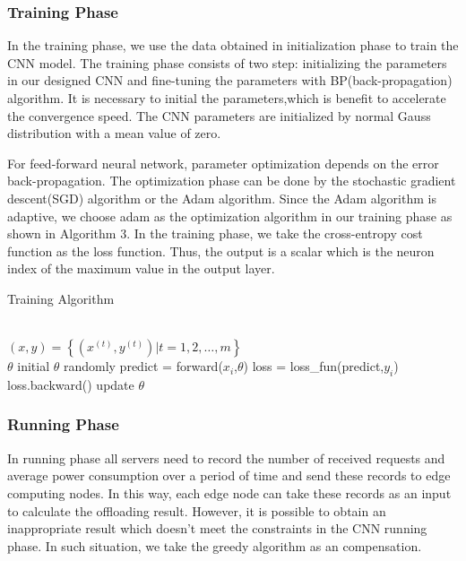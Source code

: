 \documentclass[journal]{IEEEtran}
\begin{document}
\subsubsection{Training Phase}
In the training phase, we use the data obtained in initialization phase to train the CNN model. The training phase consists of two step: initializing the parameters in our designed CNN and fine-tuning the parameters with BP(back-propagation) algorithm. It is necessary to initial the parameters,which is benefit to accelerate the convergence speed. The CNN parameters are initialized by normal Gauss distribution with a mean value of zero. 

For feed-forward neural network, parameter optimization depends on the error back-propagation. The optimization phase can be done by the stochastic gradient descent(SGD) algorithm or the Adam algorithm. Since the Adam algorithm is adaptive, we choose adam as the optimization algorithm in our training phase as shown in Algorithm 3. In the training phase, we take the cross-entropy cost function as the loss function. Thus, the output is a scalar which is the neuron index of the maximum value in the output layer.
\begin{algorithm}[!h]   
\caption{Training Algorithm}   
\label{alg:Framwork}   
\begin{algorithmic}[1]
\REQUIRE ~~\\
$(x,y)= \left\{(x^{(t)},y^{(t)})|t=1,2,\dots,m \right\}$
\ENSURE  ~~\\
$\theta$
\STATE initial $\theta$ randomly
\STATE predict = forward($x_i$,$\theta$)
\STATE loss = loss\_fun(predict,$y_i$)
\STATE loss.backward()
\STATE update $\theta$
\ENDFOR
\end{algorithmic}  
\end{algorithm} 

\subsubsection{Running Phase} 
In running phase all servers need to record the number of received requests and average power consumption over a period of time and send these records to edge computing nodes. In this way, each edge node can take these records as an input to calculate the offloading result. However, it is possible to obtain an inappropriate result which doesn't meet the constraints in the CNN running phase. In such situation, we take the greedy algorithm as an compensation.
\end{document}

